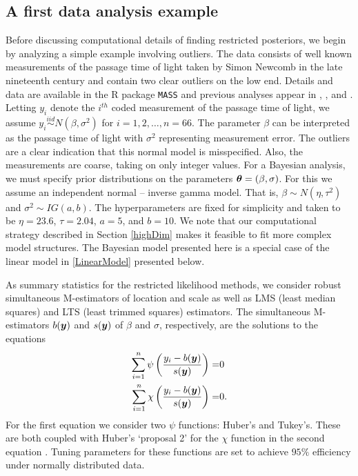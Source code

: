 \documentclass[12pt]{article}
\def\bth{\mbox{\boldmath $\theta$}}
\newcommand{\by}{\mbox{\boldmath $y$}}
\newcommand{\iid}{\stackrel{iid}{\sim}}
\newcommand{\green}[1]{{\color{green}#1}}
\begin{document}
\subsection{A first data analysis example} %
\label{darwinAnalysis}
Before discussing computational details of finding restricted 
posteriors, we begin by analyzing a simple example involving
outliers. The data consists of well known measurements of the \green{passage time} of
light taken by Simon Newcomb in the late nineteenth century and
contain two clear outliers on the low end. Details and data are
available in the R package {\tt MASS} and previous analyses appear in
\cite{stigler1977}, \cite{chan1980}, and \cite{gelman2004}. Letting
$y_{i}$ denote the $i^{th}$ coded measurement of the passage time of light, we
assume $y_{i}\iid N (\beta, \sigma^{2})$ for $i=1,2,\dots, n=66$. The
parameter $\beta$ can be interpreted as the passage time of light with
$\sigma^{2}$ representing measurement error. The outliers \green{are a clear indication} %
that this normal model is misspecified.  \green{Also,} %
the measurements are coarse, taking on only
integer values.  For a Bayesian analysis, we must specify prior
distributions on the parameters $\bth=(\beta, \sigma)$. For this we
assume an independent normal -- inverse gamma model. That is,
$\beta\sim N(\eta, \tau^{2})$ and $\sigma^{2}\sim IG(a, b)$. The
hyperparameters  are fixed for simplicity and taken to be $\eta=23.6$,
$\tau=2.04$, $a=5$,  and $b=10$. We note that our computational
strategy described in Section \ref{highDim} makes it feasible to fit
more complex model structures. The Bayesian model presented here is a
special case of the linear model in \eqref{LinearModel} presented below.

As summary statistics for the restricted likelihood methods, we
consider robust simultaneous M-estimators of location and scale as
well as LMS (least median squares) and LTS (least trimmed squares) estimators. The simultaneous M-estimators $b(\by)$ and $s(\by)$ of $\beta$ and $\sigma$, respectively, are the solutions to the equations
\begin{eqnarray}
\label{Mest}
 \sum_{i=1}^n \psi\left(\frac{y_i - b(\by)}{s(\by)}\right)= & 0 \\
 \sum_{i=1}^n \chi\left(\frac{y_i - b(\by)}{s(\by)}\right)= & 0 . \nonumber 
\end{eqnarray} 
For the first equation we consider two $\psi$ functions: Huber's and Tukey's. These are both coupled with Huber's `proposal 2'  for the $\chi$ function in the second equation \citep[for details see][]{huber2009}. Tuning parameters for these functions are set to achieve $95\%$ efficiency under normally distributed data. 
\end{document}
